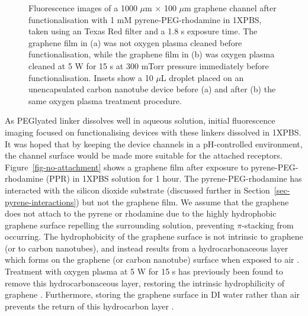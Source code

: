 \documentclass[
  a4paper,
]{scrbook}
\begin{document}
\begin{figure}
\begin{minipage}[t]{0.47\linewidth}
{{}

}

\subcaption{\label{fig-attachment-post-plasma}}
\end{minipage}%

\caption{\label{fig-hydrophobicity}Fluorescence images of a 1000
\(\mu\)m \(\times\) 100 \(\mu\)m graphene channel after
functionalisation with 1 mM pyrene-PEG-rhodamine in 1XPBS, taken using
an Texas Red filter and a 1.8 s exposure time. The graphene film in (a)
was not oxygen plasma cleaned before functionalisation, while the
graphene film in (b) was oxygen plasma cleaned at 5 W for 15 s at 300
mTorr pressure immediately before functionalisation. Insets show a 10
\(\mu\)L droplet placed on an unencapsulated carbon nanotube device
before (a) and after (b) the same oxygen plasma treatment procedure.}

\end{figure}

As PEGlyated linker dissolves well in aqueous solution, initial
fluorescence imaging focused on functionalising devices with these
linkers dissolved in 1XPBS. It was hoped that by keeping the device
channels in a pH-controlled environment, the channel surface would be
made more suitable for the attached receptors.
Figure~\ref{fig-no-attachment} shows a graphene film after exposure to
pyrene-PEG-rhodamine (PPR) in 1XPBS solution for 1 hour. The
pyrene-PEG-rhodamine has interacted with the silicon dioxide substrate
(discussed further in Section~\ref{sec-pyrene-interactions}) but not the
graphene film. We assume that the graphene does not attach to the pyrene
or rhodamine due to the highly hydrophobic graphene surface repelling
the surrounding solution, preventing \(\pi\)-stacking from occurring.
The hydrophobicity of the graphene surface is not intrinsic to graphene
(or to carbon nanotubes), and instead results from a hydrocarbonaceous
layer which forms on the graphene (or carbon nanotube) surface when
exposed to air \autocite{Ashraf2014,Stando2019}. Treatment with oxygen
plasma at 5 W for 15 s has previously been found to remove this
hydrocarbonaceous layer, restoring the intrinsic hydrophilicity of
graphene \autocite{Shin2010}. Furthermore, storing the graphene surface
in DI water rather than air prevents the return of this hydrocarbon
layer \autocite{Ashraf2014}.
\end{document}
